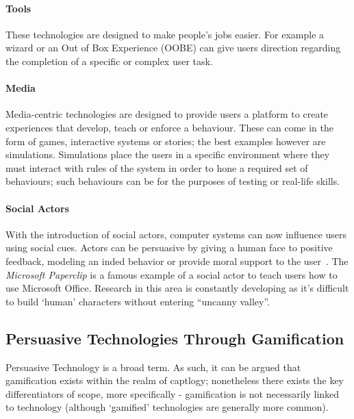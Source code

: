\paragraph{Tools}
These technologies are designed to make people's jobs easier\cite{fogg}. For example a wizard or an Out of Box Experience (OOBE) can give users direction regarding the completion of a specific or complex user task.
\paragraph{Media}
Media-centric technologies are designed to provide users a platform to create experiences that develop, teach or enforce a behaviour. These can come in the form of games, interactive systems or stories;  the best examples however are simulations. Simulations place the users in a specific environment where they must interact with rules of the system in order to hone a required set of behaviours; such behaviours can be for the purposes of testing or real-life skills. 
\paragraph{Social Actors}
With the introduction of social actors, computer systems can now influence users using social cues. Actors can be persuasive by giving a human face to positive feedback, modeling an inded behavior or provide moral support to the user~\cite{fogg}. The \emph{Microsoft Paperclip} is a famous example of a social actor to teach users how to use Microsoft Office. Research in this area is constantly developing as it's difficult to build `human' characters without entering ``uncanny valley''.
 

\subsection{Persuasive Technologies Through Gamification}
\label{sec:piano}
Persuasive Technology is a broad term. As such, it can be argued that gamification exists within the realm of captlogy; nonetheless there exists the key differentiators of scope, more specifically - gamification is not necessarily linked to technology (although `gamified' technologies are generally more common).

